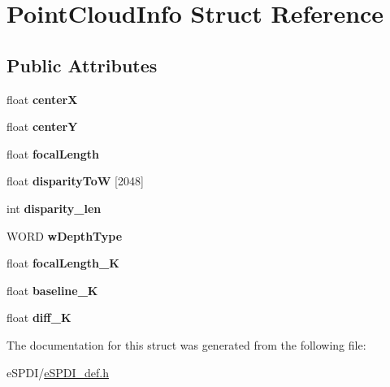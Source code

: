 \hypertarget{struct_point_cloud_info}{}\section{Point\+Cloud\+Info Struct Reference}
\label{struct_point_cloud_info}
\subsection*{Public Attributes}
\begin{DoxyCompactItemize}
\item 
\mbox{\label{struct_point_cloud_info_ae560878226eb9cc782b7f5d35059e958}} 
float {\bfseries centerX}
\item 
\mbox{\label{struct_point_cloud_info_ac1bfecd0b0df24b2a7021d61eef43269}} 
float {\bfseries centerY}
\item 
\mbox{\label{struct_point_cloud_info_ab906e6831bb94603f26115295dc73586}} 
float {\bfseries focal\+Length}
\item 
\mbox{\label{struct_point_cloud_info_acbcecff0dab26221d32de303e6110be5}} 
float {\bfseries disparity\+ToW} \mbox{[}2048\mbox{]}
\item 
\mbox{\label{struct_point_cloud_info_ae0e0da500635a0d1ee5c03d0bb340be0}} 
int {\bfseries disparity\+\_\+len}
\item 
\mbox{\label{struct_point_cloud_info_a110a7028538f3648a12b87bcf6db749f}} 
W\+O\+RD {\bfseries w\+Depth\+Type}
\item 
\mbox{\label{struct_point_cloud_info_a352e00318c51f8290d13dc043bfa5c1c}} 
float {\bfseries focal\+Length\+\_\+K}
\item 
\mbox{\label{struct_point_cloud_info_a5193bbfc0a36dbe515406f840719c48e}} 
float {\bfseries baseline\+\_\+K}
\item 
\mbox{\label{struct_point_cloud_info_ac3f970eae68804a1d17628cae7a4d287}} 
float {\bfseries diff\+\_\+K}
\end{DoxyCompactItemize}


The documentation for this struct was generated from the following file\+:\begin{DoxyCompactItemize}
\item 
e\+S\+P\+D\+I/\hyperlink{e_s_p_d_i__def_8h}{e\+S\+P\+D\+I\+\_\+def.\+h}\end{DoxyCompactItemize}
